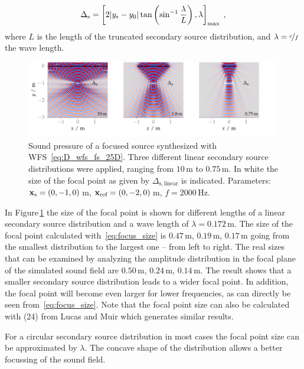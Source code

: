 %
\begin{equation}
    \Delta_\text{s} =
    \left[ 2|y_\text{s}-y_0| \tan\left(\sin^{-1} \frac{\lambda}{L}
    \right), \lambda \right]_\text{max} \qc
    \label{eq:focus_size}
\end{equation}
where $L$ is the length of the
truncated secondary source distribution, and $\lambda = \nicefrac{c}{f}$ the wave
length.
%
\begin{figure}[t]
    \includegraphics{fig3_06/fig3_06}
    \caption{Sound pressure of a focused source synthesized with
    \twohalfD \ac{WFS}~\protect\eqref{eq:D_wfs_fs_25D}.
    Three different linear secondary source distributions were
    applied, ranging from $10$\,m to $0.75$\,m. In white the size of the focal
    point as given by $\Delta_{\text{s},\,\text{linear}}$ is
    indicated. Parameters: $\mathbf{x}_\text{s} = (0,-1,0)$\,m, $\mathbf{x}_\text{ref} = (0,-2,0)$\,m, $f =
    2000$\,Hz.
    }
    \label{fig:focal_point_size}
\end{figure}
%
In Figure\,\ref{fig:focal_point_size} the size of the focal point is shown
for different lengths of a linear secondary source distribution and a wave
length of $\lambda = 0.172$\,m. The size of the focal point calculated
with~\eqref{eq:focus_size} is
$0.47$\,m, $0.19$\,m, $0.17$\,m going from the smallest distribution to the
largest one -- from left to right. The real sizes that can be examined by analyzing the
amplitude distribution in the focal plane of the simulated sound field
are $0.50$\,m, $0.24$\,m, $0.14$\,m.
The result shows that a smaller secondary source distribution leads to a wider
focal point. In addition, the focal point will become even larger for lower
frequencies, as can directly be seen from~\eqref{eq:focus_size}.
Note that the focal point size can also be calculated with (24) from Lucas
and Muir which generates similar results.

For a circular secondary source distribution in most cases the focal point size
can be approximated by $\lambda$. The concave shape of the distribution allows
a better focussing of the sound field.

